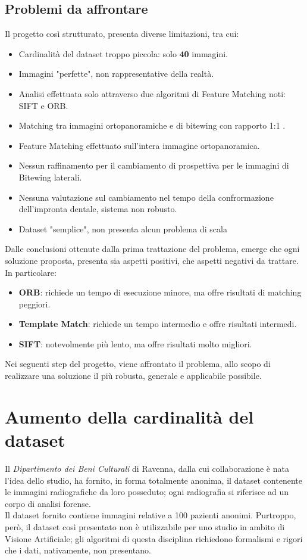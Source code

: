 \documentclass[12pt,a4paper,openright,twoside]{book}
\begin{document}
\section{Problemi da affrontare}
Il progetto così strutturato, presenta diverse limitazioni, tra cui:
\begin{itemize}
\item Cardinalità del dataset troppo piccola: solo \textbf{40} immagini.
\item Immagini "perfette", non rappresentative della realtà.
\item Analisi effettuata solo attraverso due algoritmi di Feature Matching noti: SIFT e ORB.
\item Matching tra  immagini ortopanoramiche e di bitewing con rapporto 1:1 .
\item Feature Matching effettuato sull'intera immagine ortopanoramica.
\item Nessun raffinamento per il cambiamento di prospettiva per le immagini di Bitewing laterali.
\item Nessuna valutazione sul cambiamento nel tempo della confrormazione dell'impronta dentale, sistema non robusto.
\item Dataset  "semplice", non presenta alcun problema di scala
\end{itemize}
Dalle conclusioni ottenute dalla prima trattazione del problema, emerge che ogni soluzione proposta, presenta sia aspetti positivi, che aspetti negativi da trattare. In particolare:
\begin{itemize}
\item \textbf{ORB}: richiede un tempo di esecuzione minore, ma offre risultati di matching peggiori.
\item \textbf{Template Match}: richiede un tempo intermedio e offre risultati intermedi.
\item \textbf{SIFT}: notevolmente più lento, ma offre risultati molto migliori.
\end{itemize}
Nei seguenti step del progetto, viene affrontato il problema, allo scopo di realizzare una soluzione il più robusta, generale e applicabile possibile.


\chapter{Aumento della cardinalità del dataset}
Il {\itshape Dipartimento dei Beni Culturali} di Ravenna, dalla cui collaborazione è nata l'idea dello studio, ha fornito, in forma totalmente anonima, il dataset contenente le immagini radiografiche da loro posseduto; ogni radiografia si riferisce ad un corpo di analisi forense. \\
Il dataset fornito contiene immagini relative a 100 pazienti anonimi. Purtroppo, però, il dataset così presentato non è utilizzabile per uno studio in ambito di Visione Artificiale; gli algoritmi di questa disciplina richiedono formalismi e rigori che i dati, nativamente, non presentano.\\
\end{document}
